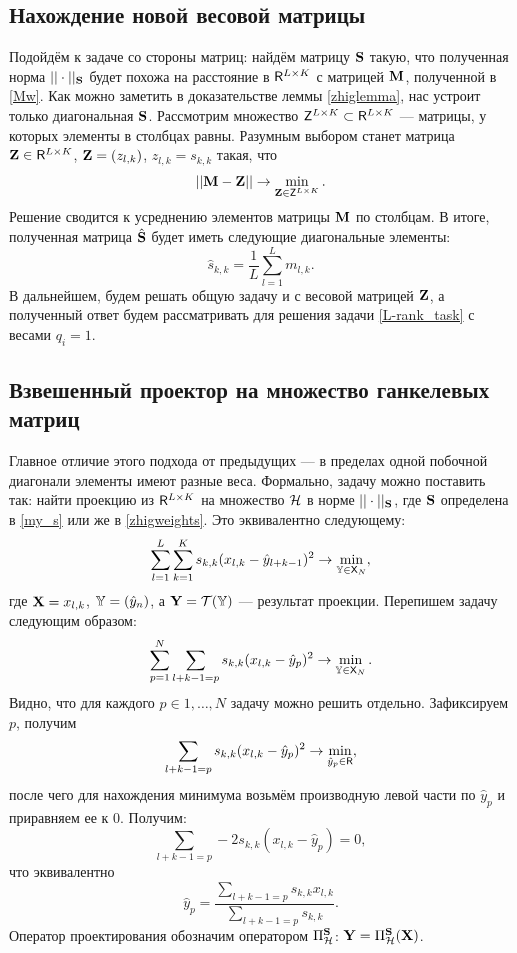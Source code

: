 \documentclass[12pt,a4paper,fleqn,leqno]{article}
\begin{document}
\subsection{Нахождение новой весовой матрицы}
Подойдём к задаче со стороны матриц: найдём матрицу $\mathbf{S}$ такую, что полученная норма $||\cdot||_{\mathbf{S}}$ будет похожа на расстояние в $\mathsf{R}^{L \times K }$ с матрицей $\mathbf{M}$, полученной в \eqref{Mw}. Как можно заметить в доказательстве леммы \ref{zhiglemma}, нас устроит только диагональная $\mathbf{S}$. Рассмотрим множество $\mathsf{Z}^{L \times K} \subset \mathsf{R}^{L \times K}$ --- матрицы, у которых элементы в столбцах равны. Разумным выбором станет матрица $\mathbf{Z} \in \mathsf{R}^{L \times K}$, $\mathbf{Z}=(z_{l,k})$, $z_{l,k} = s_{k,k}$ такая, что
\begin{equation*}
||\mathbf{M} - \mathbf{Z}|| \to \min_{\mathbf{Z} \in \mathsf{Z}^{L \times K}}.
\end{equation*}
Решение сводится к усреднению элементов матрицы $\mathbf{M}$ по столбцам. В итоге, полученная матрица $\hat {\mathbf{S}}$ будет иметь следующие диагональные элементы:
\begin{equation}\label{my_s}
\hat s_{k,k} = \frac{1}{L}\sum_{l=1}^L m_{l, k}.
\end{equation}
В дальнейшем, будем решать общую задачу и с весовой матрицей $\mathbf{Z}$, а полученный ответ будем рассматривать для решения задачи \eqref{L-rank_task} с весами $q_i = 1$.
\subsection{Взвешенный проектор на множество ганкелевых матриц}
Главное отличие этого подхода от предыдущих --- в пределах одной побочной диагонали элементы имеют разные веса. Формально, задачу можно поставить так: найти проекцию из $\mathsf{R}^{L \times K}$ на множество $\mathcal{H}$ в норме $||\cdot||_{\mathbf{S}}$, где $\mathbf{S}$ определена в \eqref{my_s} или же в \eqref{zhigweights}. Это эквивалентно следующему:
\begin{equation*}
\sum_{l=1}^L \sum_{k=1}^K s_{k,k}(x_{l,k} - \hat{y}_{l+k-1})^2 \to \min_{\mathbb{Y} \in \mathsf{X}_N},
\end{equation*}
где $\mathbf{X} = x_{l,k}$, $\mathbb{Y} = (\hat{y}_n)$, а $\mathbf{Y} = \mathcal{T}(\mathbb{Y})$ --- результат проекции. Перепишем задачу следующим образом:
\begin{equation*}
\sum_{p=1}^N \sum_{l+k-1=p} s_{k,k}(x_{l,k} - \hat{y}_p)^2 \to \min_{\mathbb{Y} \in \mathsf{X}_N}.
\end{equation*}
Видно, что для каждого $p \in 1, \ldots, N$ задачу можно решить отдельно. Зафиксируем $p$, получим
\begin{equation*}
\sum_{l+k-1=p} s_{k,k}(x_{l,k} - \hat{y}_p)^2 \to \min_{\hat{y}_p \in \mathsf{R}},
\end{equation*}
после чего для нахождения минимума возьмём производную левой части по $\hat{y}_p$ и приравняем ее к $0$. Получим:
\begin{equation*}
\sum_{l+k-1=p} -2s_{k,k}(x_{l,k} - \hat{y}_p) = 0,
\end{equation*}
что эквивалентно
\begin{equation*}
\hat{y}_p = \frac{\sum_{l+k-1=p} s_{k,k} x_{l,k}}{\sum_{l+k-1=p} s_{k,k} }.
\end{equation*}
Оператор проектирования обозначим оператором $\Pi_{\mathcal{H}}^{\mathbf{S}}$: $\mathbf{Y} = \Pi_{\mathcal{H}}^{\mathbf{S}}(\mathbf{X})$.
\end{document}
